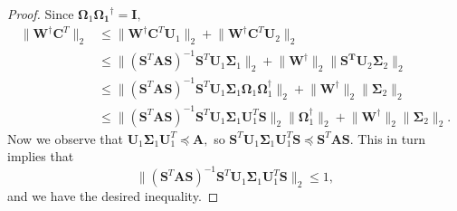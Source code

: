 \documentclass[11pt,letterpaper,twoside,reqno,nosumlimits]{amsart}
\def\pinv{\dagger}
\def\transp{T}
\newcommand{\mat}[1]{\ensuremath{\mathbf{#1}}}
\newcommand{\snorm}[1]{\ensuremath{\big\|#1\big\|_2}}
\theoremstyle{remark}
\begin{document}
\begin{proof}
 Since $\mat{\Omega}_1 \mat{\Omega_1}^\pinv = \mat{I},$
\[
 \begin{aligned}
 \snorm{\mat{W}^\pinv \mat{C}^\transp} & \leq \snorm{\mat{W}^\pinv \mat{C}^\transp \mat{U}_1} + \snorm{\mat{W}^\pinv \mat{C}^\transp \mat{U}_2 } \\
      & \leq \snorm{(\mat{S}^\transp \mat{A} \mat{S})^{-1} \mat{S}^\transp \mat{U}_1 \mat{\Sigma}_1} + \snorm{\mat{W}^\pinv} \snorm{\mat{S^\transp} \mat{U}_2 \mat{\Sigma}_2 } \\
      & \leq \snorm{(\mat{S}^\transp \mat{A} \mat{S})^{-1} \mat{S}^\transp \mat{U}_1 \mat{\Sigma}_1 \mat{\Omega}_1 \mat{\Omega}_1^\pinv} + \snorm{\mat{W}^\pinv} \snorm{\mat{\Sigma}_2} \\
      & \leq \snorm{(\mat{S}^\transp \mat{A} \mat{S})^{-1} \mat{S}^\transp \mat{U}_1 \mat{\Sigma}_1 \mat{U}_1^\transp \mat{S}} \snorm{\mat{\Omega}_1^\pinv} + \snorm{\mat{W}^\pinv} \snorm{\mat{\Sigma}_2}.
 \end{aligned}
\]
Now we observe that $\mat{U}_1 \mat{\Sigma}_1 \mat{U}_1^\transp \preceq \mat{A},$ so $\mat{S}^\transp \mat{U}_1 \mat{\Sigma}_1 \mat{U}_1^\transp\mat{S} \preceq \mat{S}^\transp \mat{A} \mat{S}.$ This in turn implies that
\[
 \snorm{(\mat{S}^\transp \mat{A} \mat{S})^{-1} \mat{S}^\transp \mat{U}_1 \mat{\Sigma}_1 \mat{U}_1^\transp \mat{S}} \leq 1,
\]
and we have the desired inequality.
\end{proof}
\end{document}
